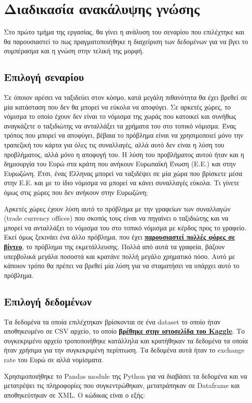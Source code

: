 \label{Chapter1}

\section{Διαδικασία ανακάλυψης γνώσης}

Στο πρώτο τμήμα της εργασίας, θα γίνει η ανάλυση του σεναρίου που επιλέχτηκε και θα παρουσιαστεί το πως πραγματοποιήθηκε η διαχείριση των δεδομένων για να βγει το συμπέρασμα και η γνώση στην τελική της μορφή.

\subsection{Επιλογή σεναρίου}

Σε όποιον αρέσει να ταξιδεύει στον κόσμο, κατά μεγάλη πιθανότητα θα έχει βρεθεί σε μία κατάσταση που δεν θα μπορεί να εύκολα να αποφύγει. Σε αρκετές χώρες, το νόμισμα το οποίο έχουν δεν είναι το νόμισμα της χωράς που κατοικεί και συνήθως αναγκάζετε ο ταξιδιώτης να ανταλλάξει τα χρήματα του στο τοπικό νόμισμα. Ένας τρόπος που μπορεί να αποφύγει, βέβαια το πρόβλημα είναι να χρησιμοποιεί μόνο την τραπεζική του κάρτα για όλες τις συναλλαγές, αλλά αυτό δεν είναι η λύση του προβλήματος, αλλά μόνο η αποφυγή του. Η λύση του προβλήματος αυτού ήταν και η δημιουργία του Ευρώ στα κράτη που ανήκουν Ευρωπαϊκή Ένωση (Ε.Ε.) και στην Ευρωζώνη. Έτσι, ένας Έλληνας μπορεί να ταξιδέψει σε μία χώρα που βρίσκετε μέσα στην Ε.Ε. και με το ίδιο νόμισμα να μπορεί να κάνει συναλλαγές εύκολα. Τι γίνετε όμως στις χώρες που δεν ανήκουν στην Ευρωζώνη; \par
Αρκετές χώρες έχουν λύση αυτό το πρόβλημα με την γραφείων των συναλλαγών (trade currency offices) που σκοπός τους είναι να πηγαίνει ο ταξιδιώτης και να μπορεί να ανταλλάξει το νόμισμα του στο τοπικό νόμισμα με κέρδος προς το γραφείο. Εκεί όμως ξεκινάει ένα άλλο πρόβλημα, που έχει \href{https://www.youtube.com/watch?v=6zwiArr3jYE}{\textbf{παρουσιαστεί πολλές φόρες σε βίντεο}}, το πρόβλημα της εκμετάλλευσης. Πολλά από αυτά τα γραφεία, βάζουν υπερβολικά μεγάλα ποσοστά και κρατάνε πολλή μεγάλο χρηματικό πόσο. Αυτό με κάποιον τρόπο θα πρέπει να βρεθεί μία λύση για να σταματήσει να υπάρχει αυτό το πρόβλημα.

\subsection{Επιλογή δεδομένων}

Τα δεδομένα τα οποία επιλέχτηκαν βρίσκονται σε ένα dataset το οποίο ήταν αποθηκευμένο σε CSV αρχείο, το οποίο \href{https://www.kaggle.com/dhruvildave/currency-exchange-rates}{\textbf{βρέθηκε στην ιστοσελίδα του Kaggle}}. Το συγκεκριμένο αρχείο τροποποιήθηκε κατάλληλα και κρατήθηκαν τα δεδομένα τα οποία ήταν χρήσιμα για την συγκεκριμένη περίπτωση. Τα δεδομένα αυτά ήταν το exchange rate του Ευρώ σε αλλά νομίσματα. \par
Χρησιμοποιήθηκε το Pandas module της Python για να διαβάσει τα δεδομένα και να μετατρέψει τις πληροφορίες που συγκεντρώθηκαν, μετατράπηκαν σε Dataframe και αποθηκεύτηκαν σε XML. Ο κώδικας είναι ο εξής:

